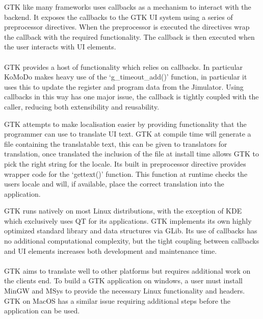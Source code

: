   GTK like many frameworks uses callbacks as a mechanism to interact with the backend. It exposes the callbacks to the GTK UI system using a series of preprocessor directives. When the preprocessor is executed the directives wrap the callback with the required functionality. The callback is then executed when the user interacts with UI elements.\\\\
  GTK provides a host of functionality which relies on callbacks. In particular KoMoDo makes heavy use of the `g\_timeout\_add()' function, in particular it uses this to update the register and program data from the Jimulator. Using callbacks in this way has one major issue, the callback is tightly coupled with the caller, reducing both extensibility and reusability.

  GTK attempts to make localisation easier by providing functionality that the programmer can use to translate UI text. GTK at compile time will generate a file containing the translatable text, this can be given to translators for translation, once translated the inclusion of the file at install time allows GTK to pick the right string for the locale. Its built in preprocessor directive provides wrapper code for the `gettext()' function. This function at runtime checks the users locale and will, if available, place the correct translation into the application.

  GTK runs natively on most Linux distributions, with the exception of KDE which exclusively uses QT for its applications. GTK implements its own highly optimized standard library and data structures via GLib. Its use of callbacks has no additional computational complexity, but the tight coupling between callbacks and UI elements increases both development and maintenance time.\\\\
  GTK aims to translate well to other platforms but requires additional work on the clients end. To build a GTK application on windows, a user must install MinGW and MSys to provide the necessary Linux functionality and headers. GTK on MacOS has a similar issue requiring additional steps before the application can be used.

